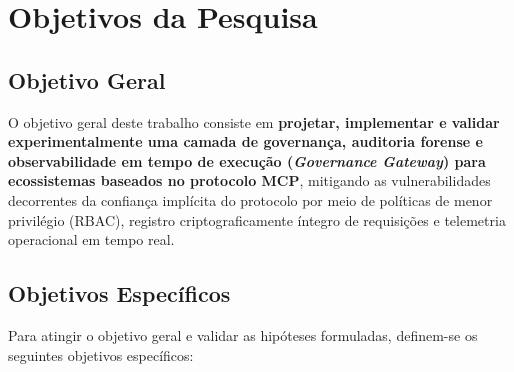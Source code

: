 \section{Objetivos da Pesquisa}
\label{sec:objetivos}

\subsection{Objetivo Geral}
\label{subsec:obj_geral}

O objetivo geral deste trabalho consiste em \textbf{projetar, implementar e validar experimentalmente uma camada de governança, auditoria forense e observabilidade em tempo de execução (\textit{Governance Gateway}) para ecossistemas baseados no protocolo MCP}, mitigando as vulnerabilidades decorrentes da confiança implícita do protocolo por meio de políticas de menor privilégio (RBAC), registro criptograficamente íntegro de requisições e telemetria operacional em tempo real.

\subsection{Objetivos Específicos}
\label{subsec:obj_especificos}

Para atingir o objetivo geral e validar as hipóteses formuladas, definem-se os seguintes objetivos específicos:


